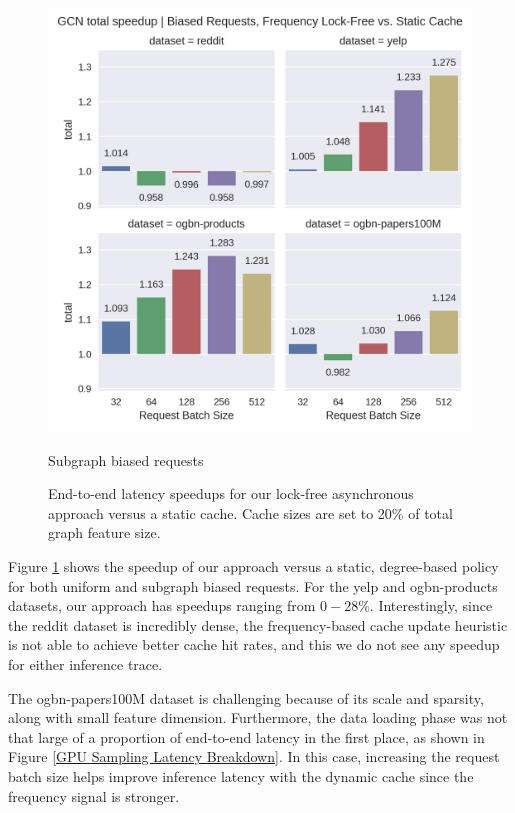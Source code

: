 \begin{figure}[h!]
\begin{minipage}[c]{0.46\textwidth}
        \includegraphics[width=\textwidth]{figures/speedup_GCN_total_bias.png}    
        \caption*{Subgraph biased requests}
    \end{minipage}
    \caption{End-to-end latency speedups for our lock-free asynchronous approach versus a static cache. Cache sizes are set to 20\% of total graph feature size.}
    \label{Eval: Speedups}
\end{figure}    

Figure \ref{Eval: Speedups} shows the speedup of our approach versus a static, degree-based policy for both uniform and subgraph biased requests. For the yelp and ogbn-products datasets, our approach has speedups ranging from $0-28\%$. Interestingly, since the reddit dataset is incredibly dense, the frequency-based cache update heuristic is not able to achieve better cache hit rates, and this we do not see any speedup for either inference trace.

The ogbn-papers100M dataset is challenging because of its scale and sparsity, along with small feature dimension. Furthermore, the data loading phase was not that large of a proportion of end-to-end latency in the first place, as shown in Figure \ref{GPU Sampling Latency Breakdown}. In this case, increasing the request batch size helps improve inference latency with the dynamic cache since the frequency signal is stronger.

